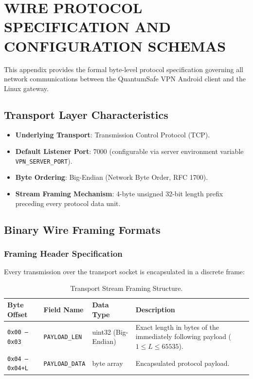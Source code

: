 
\chapter{WIRE PROTOCOL SPECIFICATION AND CONFIGURATION SCHEMAS}
\label{app:wire_protocol}

This appendix provides the formal byte-level protocol specification governing all network communications between the QuantumSafe VPN Android client and the Linux gateway.

\section{Transport Layer Characteristics}
\begin{itemize}
    \item \textbf{Underlying Transport}: Transmission Control Protocol (TCP).
    \item \textbf{Default Listener Port}: 7000 (configurable via server environment variable \texttt{VPN\_SERVER\_PORT}).
    \item \textbf{Byte Ordering}: Big-Endian (Network Byte Order, RFC 1700).
    \item \textbf{Stream Framing Mechanism}: 4-byte unsigned 32-bit length prefix preceding every protocol data unit.
\end{itemize}

\section{Binary Wire Framing Formats}

\subsection{Framing Header Specification}
Every transmission over the transport socket is encapsulated in a discrete frame:
\begin{table}[htbp]
  \centering
  \small
  \caption{Transport Stream Framing Structure.}
  \label{tab:stream_framing_struct}
  \begin{tabular}{@{}P{2.5cm}P{2.5cm}P{3.0cm}P{5.5cm}@{}}
    \toprule
    \textbf{Byte Offset} & \textbf{Field Name} & \textbf{Data Type} & \textbf{Description} \\
    \midrule
    \texttt{0x00 -- 0x03} & \texttt{PAYLOAD\_LEN} & uint32 (Big-Endian) & Exact length in bytes of the immediately following payload ($1 \le L \le 65535$). \\
    \texttt{0x04 -- 0x04+L} & \texttt{PAYLOAD\_DATA} & byte array & Encapsulated protocol payload. \\
    \bottomrule
  \end{tabular}
\end{table}

